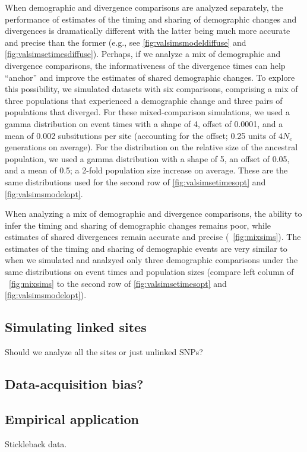 When demographic and divergence comparisons are analyzed separately, the
performance of estimates of the timing and sharing of demographic changes and
divergences is dramatically different with the latter being much more accurate
and precise than the former
(e.g., see
\figs
\ref{fig:valsimsmodeldiffuse}
and
\ref{fig:valsimsetimesdiffuse}).
Perhaps, if we analyze a mix of demographic and divergence comparisons,
the informativeness of the divergence times can help ``anchor'' and
improve the estimates of shared demographic changes.
To explore this possibility, we simulated datasets with six comparisons,
comprising a mix of three populations that experienced a demographic change and
three pairs of populations that diverged.
For these mixed-comparison simulations, we used a gamma distribution on event
times with a shape of 4, offset of 0.0001, and a mean of 0.002 subsitutions per
site (accounting for the offset; 0.25 units of $4N_e$ generations on average).
For the distribution on the relative size of the ancestral population,
we used a gamma distribution with a shape of 5, an offset of 0.05, and a mean
of 0.5; a 2-fold population size increase on average.
These are the same distributions used for the second row of
\figs
\ref{fig:valsimsetimesopt}
and
\ref{fig:valsimsmodelopt}.

When analyzing a mix of demographic and divergence comparisons, the ability to
infer the timing and sharing of demographic changes remains poor, while
estimates of shared divergences remain accurate and precise
(\fig{}~\ref{fig:mixsims}).
The estimates of the timing and sharing of demographic events are very similar
to when we simulated and analzyed only three demographic comparisons under the
same distributions on event times and population sizes
(compare left column of \fig{}~\ref{fig:mixsims}
to the second row of \figs
\ref{fig:valsimsetimesopt}
and
\ref{fig:valsimsmodelopt}).

\ifembed{

}{}


\subsection{Simulating linked sites}

Should we analyze all the sites or just unlinked SNPs?

\ifembed{

}{}


\subsection{Data-acquisition bias?}


\subsection{Empirical application}
Stickleback data.
